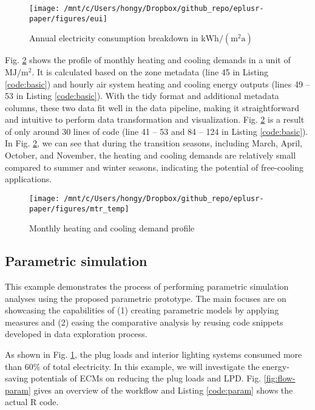 \documentclass[3p, times]{elsarticle} %
\begin{document}
\begin{figure}[!htb]
\texttt{[image: /mnt/c/Users/hongy/Dropbox/github\_repo/eplusr-paper/figures/eui]} \caption{Annual electricity consumption breakdown in $\mathrm{kWh}/(\mathrm{m}^2 \mathrm{a})$}\label{fig:eui}
\end{figure}

Fig. \ref{fig:aircon-out} shows the profile of monthly heating and cooling
demands in a unit of \(\mathrm{MJ}/\mathrm{m}^2\). It is calculated based on the
zone metadata (line 45 in Listing \ref{code:basic}) and hourly air system
heating and cooling energy outputs (lines 49 -- 53 in Listing
\ref{code:basic}). With the tidy format and additional metadata columns, these
two data fit well in the data pipeline, making it straightforward and intuitive
to perform data transformation and visualization. Fig. \ref{fig:aircon-out} is
a result of only around 30 lines of code (line 41 -- 53 and 84 -- 124 in Listing
\ref{code:basic}). In Fig. \ref{fig:aircon-out}, we can see that during the
transition seasons, including March, April, October, and November, the heating
and cooling demands are relatively small compared to summer and winter seasons,
indicating the potential of free-cooling applications.

\begin{figure}[!htb]
\texttt{[image: /mnt/c/Users/hongy/Dropbox/github\_repo/eplusr-paper/figures/mtr\_temp]} \caption{Monthly heating and cooling demand profile}\label{fig:aircon-out}
\end{figure}

\hypertarget{sec:param}{%
\subsection{Parametric simulation}\label{sec:param}}

This example demonstrates the process of performing parametric simulation
analyses using the proposed parametric prototype. The main focuses are on
showcasing the capabilities of (1) creating parametric models by applying
measures and (2) easing the comparative analysis by reusing code snippets
developed in data exploration process.

As shown in Fig. \ref{fig:eui}, the plug loads and interior lighting systems
consumed more than 60\% of total electricity. In this example, we will
investigate the energy-saving potentials of ECMs on reducing the plug loads and
LPD. Fig. \ref{fig:flow-param} gives an overview of the workflow and Listing
\ref{code:param} shows the actual R code.
\end{document}
